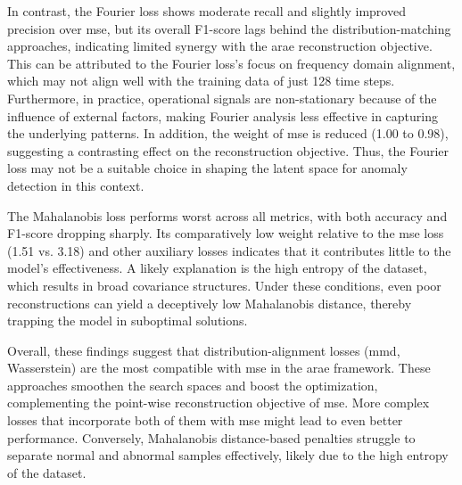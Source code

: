 In contrast, the Fourier loss shows moderate recall and slightly improved precision over \gls{mse}, but its overall F1-score lags behind the distribution-matching approaches, indicating limited synergy with the \gls{arae} reconstruction objective.
This can be attributed to the Fourier loss's focus on frequency domain alignment, which may not align well with the training data of just 128 time steps.
Furthermore, in practice, operational signals are non-stationary because of the influence of external factors, making Fourier analysis less effective in capturing the underlying patterns.
In addition, the weight of \gls{mse} is reduced (1.00 to 0.98), suggesting a contrasting effect on the reconstruction objective.
Thus, the Fourier loss may not be a suitable choice in shaping the latent space for anomaly detection in this context.

The Mahalanobis loss performs worst across all metrics, with both accuracy and F1-score dropping sharply.
Its comparatively low weight relative to the \gls{mse} loss (1.51 vs. 3.18) and other auxiliary losses indicates that it contributes little to the model's effectiveness.
A likely explanation is the high entropy of the dataset, which results in broad covariance structures. 
Under these conditions, even poor reconstructions can yield a deceptively low Mahalanobis distance, thereby trapping the model in suboptimal solutions.



Overall, these findings suggest that distribution-alignment losses (\gls{mmd}, Wasserstein) are the most compatible with \gls{mse} in the \gls{arae} framework.
These approaches smoothen the search spaces and boost the optimization, complementing the point-wise reconstruction objective of \gls{mse}.
More complex losses that incorporate both of them with \gls{mse} might lead to even better performance.
Conversely, Mahalanobis distance-based penalties struggle to separate normal and abnormal samples effectively, likely due to the high entropy of the dataset.
